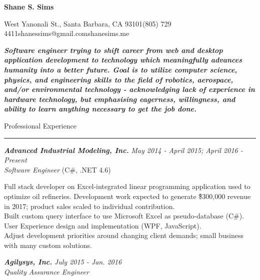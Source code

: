 \documentclass[10pt]{article}
\newcommand{\simsbullet}{{\raisebox{2pt}{\tiny $\bullet$}}\hspace{8pt}}
\newcommand{\midlinesimsbullet}{\hspace{4pt}{\raisebox{2pt}{\tiny $\bullet$}}\hspace{5pt}}
\begin{document}

{\centerline{\huge\bf\sffamily Shane S. Sims}}
\vskip 8pt
{\centerline{ West Yanonali St., Santa Barbara, CA 93101{\midlinesimsbullet}(805) 729 4411{\midlinesimsbullet}shanessims@gmail.com{\midlinesimsbullet}shanesims.me}}

\vskip 12pt

{\bf\it Software engineer trying to shift career from web and desktop application development to technology which meaningfully advances humanity into a better future. Goal is to utilize computer science, physics, and engineering skills to the field of robotics, aerospace, and/or environmental technology - acknowledging lack of experience in hardware technology, but emphasising eagerness, willingness, and ability to learn anything necessary to get the job done. }

\vskip 18pt


{\Large\sffamily Professional Experience}
\vskip 2pt
\hrule
\vskip 6pt

{\bfseries\itshape\sffamily Advanced Industrial Modeling, Inc.} \hfill \textsf{\textit{May 2014 - April 2015; April 2016 - Present}} \\
\textit{\textsf{Software Engineer}} (C\#, .NET 4.6)
\vskip 4pt

\setlength{\leftskip}{16pt}

Full stack developer on Excel-integrated linear programming application used to optimize oil refineries. 
\vskip 4pt
\simsbullet Development work expected to generate \~\$300,000 revenue in 2017; product sales scaled to individual contribution.\\
\simsbullet Built custom query interface to use Microsoft Excel as pseudo-database (C\#). \\
\simsbullet User Experience design and implementation (WPF, JavaScript). \\
\simsbullet Adjust development priorities around changing client demands; small business with many custom solutions. 

\setlength{\leftskip}{0pt}

\vskip 12pt

{\bfseries\itshape\sffamily Agilysys, Inc.} \hfill \textsf{\textit{July 2015 - Jan. 2016}} \\
\textit{\textsf{Quality Assurance Engineer}}
\vskip 4pt

\setlength{\leftskip}{16pt}
\end{document}
